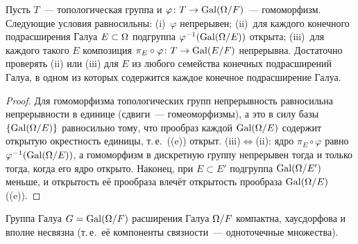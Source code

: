 \begin{lemma}
Пусть $T$~--- топологическая группа и $\varphi\colon T\to\operatorname{Gal}(\Omega/F)$~--- гомоморфизм. Следующие условия равносильны:
(i)~$\varphi$ непрерывен; (ii)~для каждого конечного подрасширения Галуа $E\subset\Omega$ подгруппа
$\varphi^{-1}(\operatorname{Gal}(\Omega/E))$ открыта; (iii)~для каждого такого $E$ композиция $\pi_E\circ\varphi\colon T\to\operatorname{Gal}(E/F)$
непрерывна. Достаточно проверять (ii) или (iii) для $E$ из любого семейства конечных подрасширений Галуа, в одном из
которых содержится каждое конечное подрасширение Галуа.
\end{lemma}

\begin{proof}
Для гомоморфизма топологических групп непрерывность равносильна непрерывности в единице (сдвиги~--- гомеоморфизмы), а
это в силу базы $\{\operatorname{Gal}(\Omega/E)\}$ равносильно тому, что прообраз каждой $\operatorname{Gal}(\Omega/E)$ содержит открытую окрестность
единицы, т.\,е.\ ((e)) открыт. (iii)$\iff$(ii): ядро $\pi_E\circ\varphi$ равно $\varphi^{-1}(\operatorname{Gal}(\Omega/E))$, а
гомоморфизм в дискретную группу непрерывен тогда и только тогда, когда его ядро открыто. Наконец, при $E\subset E'$
подгруппа $\operatorname{Gal}(\Omega/E')$ меньше, и открытость её прообраза влечёт открытость прообраза $\operatorname{Gal}(\Omega/E)$ ((e)).
\end{proof}

\begin{theorem}[7.8]
Группа Галуа $G=\operatorname{Gal}(\Omega/F)$ расширения Галуа $\Omega/F$ компактна, хаусдорфова и вполне несвязна (т.\,е.\ её компоненты
связности~--- одноточечные множества).
\end{theorem}

